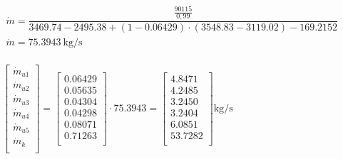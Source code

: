 \renewcommand{\arraystretch}{1.5}
\begin{math}
	\begin{array}{l}
		\dot m = \dfrac{\frac{90115}{0,99}}{
			\num{3469,74} - \num{2495,38}
			+ (1 - \num{0,06429}) \cdot (\num{3548,83} - \num{3119,02})
			- \num{169,2152}
		} \\
		\dot m = \SI{75,3943}{\kilogram\per\second} \\
	\end{array}
\end{math}

\renewcommand{\arraystretch}{1}
\begin{math}
	\left[
		\begin{array}{l}
			\dot m_{u1} \\
			\dot m_{u2} \\
			\dot m_{u3} \\
			\dot m_{u4} \\
			\dot m_{u5} \\
			\dot m_k \\
		\end{array}
	\right] = \left[
		\begin{array}{c}
			\num{0,06429} \\
			\num{0,05635} \\
			\num{0,04304} \\
			\num{0,04298} \\
			\num{0,08071} \\
			\num{0,71263} \\
		\end{array}
	\right] \cdot \num{75,3943} = \left[
		\begin{array}{r}
			\num{4,8471} \\
			\num{4,2485} \\
			\num{3,2450} \\
			\num{3,2404} \\
			\num{6,0851} \\
			\num{53,7282} \\
		\end{array}
	\right] \si{\kilogram\per\second}
\end{math}

